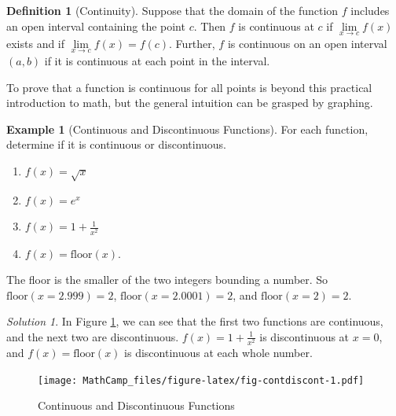 \documentclass[
]{book}
\providecommand{\tightlist}{%
  \setlength{\itemsep}{0pt}\setlength{\parskip}{0pt}}
\theoremstyle{definition}
\newtheorem{definition}{Definition}[chapter]
\theoremstyle{definition}
\newtheorem{example}{Example}[chapter]
\theoremstyle{definition}
\theoremstyle{definition}
\theoremstyle{remark}
\newtheorem*{solution}{Solution}
\begin{document}
\begin{definition}[Continuity]
\protect\hypertarget{def:unnamed-chunk-194}{}{\label{def:unnamed-chunk-194} {} }Suppose that the domain of the function \(f\) includes an open interval containing the point \(c\). Then \(f\) is continuous at \(c\) if \(\lim\limits_{x \to c} f(x)\) exists and if \(\lim\limits_{x \to c} f(x)=f(c)\). Further, \(f\) is continuous on an open interval \((a,b)\) if it is continuous at each point in the interval.
\end{definition}

To prove that a function is continuous for all points is beyond this practical introduction to math, but the general intuition can be grasped by graphing.

\begin{example}[Continuous and Discontinuous Functions]
\protect\hypertarget{exm:contdiscont}{}{\label{exm:contdiscont} {} }
For each function, determine if it is continuous or discontinuous.

\begin{enumerate}
\def\labelenumi{\arabic{enumi}.}
\tightlist
\item
  \(f(x) = \sqrt{x}\)
\item
  \(f(x) = e^x\)
\item
  \(f(x) = 1 + \frac{1}{x^2}\)
\item
  \(f(x) = \text{floor}(x)\).
\end{enumerate}

The floor is the smaller of the two integers bounding a number. So \(\text{floor}(x = 2.999) = 2\), \(\text{floor}(x = 2.0001) = 2\), and \(\text{floor}(x = 2) = 2.\)
\end{example}

\begin{solution}
{}In Figure \ref{fig:fig-contdiscont}, we can see that the first two functions are continuous, and the next two are discontinuous. \(f(x) = 1 + \frac{1}{x^2}\) is discontinuous at \(x= 0\), and \(f(x) = \text{floor}(x)\) is discontinuous at each whole number.
\end{solution}

\begin{figure}
\centering
\texttt{[image: MathCamp\_files/figure-latex/fig-contdiscont-1.pdf]}
\caption{\label{fig:fig-contdiscont}Continuous and Discontinuous Functions}
\end{figure}
\end{document}
